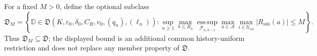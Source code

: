 For a fixed \(M>0\), define the optional subclass
\[
\mathfrak D_M=\left\{\mathbb D\in\mathfrak D(K,\varepsilon_0,\delta_0,C_R,v_0,(q_n),(\ell_n)):
\sup_{n\ge1}\max_{b\le B_n}\operatorname*{ess\,sup}_{\mathcal F_{n,b-1}}
\max_{a\in\mathcal A}\max_{i\in\mathcal U_{nb}}|R_{nbi}(a)|\le M\right\}.
\]
Thus \(\mathfrak D_M\subseteq\mathfrak D\); the displayed bound is an additional common history-uniform restriction and does not replace any member property of \(\mathfrak D\).